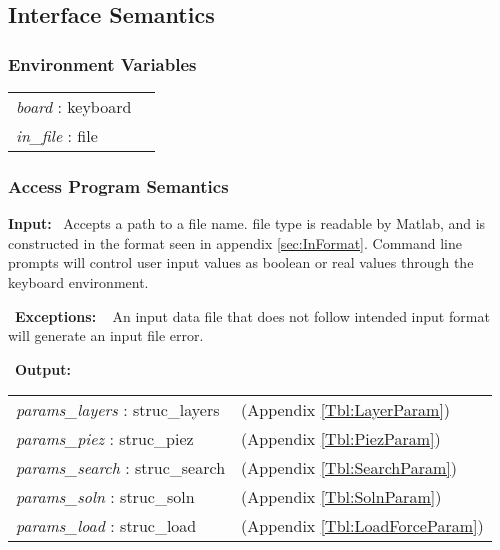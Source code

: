\documentclass[12pt]{article}
\begin{document}
\subsection{Interface Semantics}

\subsubsection{Environment Variables}

\renewcommand*{\arraystretch}{1.5}
\begin{longtable}{p{} p{}}
  \textit{board} : keyboard & \\

  \textit{in\_file} : file & \\
\end{longtable}

\subsubsection{Access Program Semantics}
\textbf{Input:} ~\newline\noindent Accepts a path to a file name. file
type is readable by Matlab, and is constructed in the format seen in
appendix \ref{sec:InFormat}. Command line prompts will control user
input values as boolean or real values through the keyboard
environment.

~\newline\noindent \textbf{Exceptions:} ~\newline\noindent
An input data file that does not follow intended input format will
generate an input file error.

~\newline\noindent \textbf{Output:}
\renewcommand*{\arraystretch}{1.5}
\begin{longtable}{p{} p{}}
  \textit{params\_layers} : struc\_layers & (Appendix
  \ref{Tbl:LayerParam})\\

  \textit{params\_piez} : struc\_piez & (Appendix
  \ref{Tbl:PiezParam})\\

  \textit{params\_search} : struc\_search & (Appendix
  \ref{Tbl:SearchParam})\\

  \textit{params\_soln} : struc\_soln & (Appendix
  \ref{Tbl:SolnParam})\\

  \textit{params\_load} : struc\_load & (Appendix
  \ref{Tbl:LoadForceParam})
\end{longtable}
\end{document}
